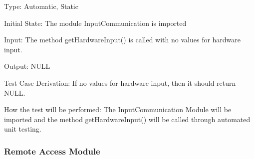 \documentclass[12pt, titlepage]{article}
\begin{document}
\begin{enumerate}[{UT-IC}1.]
Type: Automatic, Static
					
Initial State: The module InputCommunication is imported
					
Input: The method getHardwareInput() is called with no values for hardware input.
					
Output: NULL

Test Case Derivation: If no values for hardware input, then it should return NULL.

How the test will be performed: The InputCommunication Module will be imported and the method getHardwareInput() will be called through automated unit testing.

    
\end{enumerate}

\subsubsection{Remote Access Module}
\end{document}
